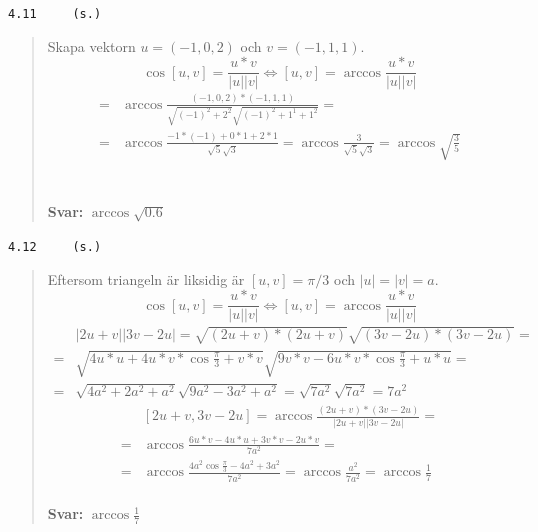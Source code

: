 \documentclass[a4paper]{article}
\newcommand{\tskcol}[1]{\textcolor{tskcol}{#1}}
\begin{document}
\texttt{\tskcol{4.11~~~~ (s.)}}
\begin{quotation}
	\noindent
	Skapa vektorn $u=(-1,0,2)$ och $v=(-1,1,1)$.
	\[\cos[u,v]=\frac{u*v}{|u||v|} \Leftrightarrow
	[u,v]=\arccos\frac{u*v}{|u||v|}\]
	\begin{align*}
	[u,v]=&\arccos\frac{(-1,0,2)*(-1,1,1)}{\sqrt{(-1)^2+2^2}\sqrt{(-1)^2+1^1+1^2}}= \\ =
	&\arccos\frac{-1*(-1)+0*1+2*1}{\sqrt{5}\sqrt{3}}=
	\arccos\frac{3}{\sqrt{5}\sqrt{3}}=
	\arccos\sqrt{\frac{3}{5}}
	\end{align*}
	\\ \\
	\textbf{Svar:} $\arccos\sqrt{0.6}$
\end{quotation}

\pagebreak
\texttt{\tskcol{4.12~~~~ (s.)}}
\begin{quotation}
	\noindent
	Eftersom triangeln är liksidig är $[u,v]=\pi/3$ och $|u|=|v|=a$.
	\[\cos[u,v]=\frac{u*v}{|u||v|} \Leftrightarrow
	[u,v]=\arccos\frac{u*v}{|u||v|}\]
	\begin{align*}
	&|2u+v||3v-2u|=
	\sqrt{(2u+v)*(2u+v)}\sqrt{(3v-2u)*(3v-2u)}= \\ =
	&\sqrt{4u*u+4u*v*\cos\frac{\pi}{3}+v*v}\sqrt{9v*v-6u*v*\cos\frac{\pi}{3}+u*u}= \\ =
	&\sqrt{4a^2+2a^2+a^2}\sqrt{9a^2-3a^2+a^2}=
	\sqrt{7a^2}\sqrt{7a^2}=
	7a^2
	\end{align*}
	\begin{align*}
	&[2u+v,3v-2u]=\arccos\frac{(2u+v)*(3v-2u)}{|2u+v||3v-2u|}= \\ =
	&\arccos\frac{6u*v-4u*u+3v*v-2u*v}{7a^2}= \\ =
	&\arccos\frac{4a^2\cos\frac{\pi}{3}-4a^2+3a^2}{7a^2}=
	\arccos\frac{a^2}{7a^2}=
	\arccos\frac{1}{7}
	\end{align*}
	\\ 
	\textbf{Svar:} $\arccos\frac{1}{7}$
\end{quotation}
\end{document}

